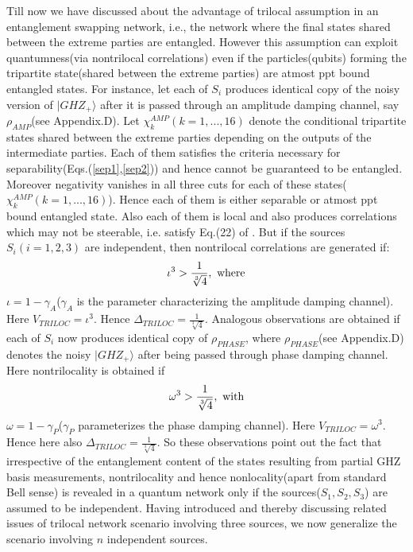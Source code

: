 \documentclass[pra,10pt,twocolumn,superscriptaddress,floatfix,showpacs]{revtex4-1}
\begin{document}
 Till now we have discussed about the advantage of trilocal assumption in an entanglement swapping network, i.e., the network where the final states shared between the extreme parties are entangled. However this assumption can exploit quantumness(via nontrilocal correlations) even if the particles(qubits) forming the tripartite state(shared between the extreme parties) are atmost ppt bound entangled states\cite{review}. For instance, let each of $S_i$ produces identical copy of the noisy version of $|GHZ_+\rangle$ after it is passed through an amplitude damping channel\cite{NIE,MARK1}, say $\rho_{AMP}$(see Appendix.D). Let $\chi_k^{AMP}(k=1,...,16)$ denote the conditional tripartite states shared between the extreme parties depending on the outputs of the intermediate parties. Each of them satisfies the criteria necessary for separability(Eqs.(\ref{sep1},\ref{sep2})) and hence cannot be guaranteed to be entangled. Moreover negativity vanishes in all three cuts for each of these states($\chi_k^{AMP}(k=1,...,16)$). Hence each of them is either separable or atmost ppt bound entangled state. Also each of them is local\cite{Sliwa} and also produces correlations which may not be steerable, i.e. satisfy Eq.(22) of \cite{caval1}. But if the sources $S_i(i=1,2,3)$ are independent, then nontrilocal correlations are generated if:
 \begin{equation}\label{amp}
    \iota^3>\frac{1}{\sqrt[3]{4}},\,\,\textmd{where}
 \end{equation}
 $\iota=1-\gamma_A$($\gamma_A$ is the parameter characterizing the amplitude damping channel). Here $V_{TRILOC}=\iota^3$. Hence $\Delta_{TRILOC}=\frac{1}{\sqrt[3]{4}}$. Analogous observations are obtained if each of $S_i$ now produces identical copy of $\rho_{PHASE}$, where $\rho_{PHASE}$(see Appendix.D) denotes the noisy $|GHZ_+\rangle$ after being passed through phase damping channel\cite{NIE,MARK1}. Here nontrilocality is obtained if
  \begin{equation}\label{phase}
    \omega^3>\frac{1}{\sqrt[3]{4}},\,\, \textmd{with}
  \end{equation}
  $\omega=1-\gamma_P$($\gamma_P$ parameterizes the phase damping channel). Here $V_{TRILOC}=\omega^3$.
  Hence here also $\Delta_{TRILOC}=\frac{1}{\sqrt[3]{4}}$. So these observations point out the fact that irrespective of the entanglement content of the states resulting from partial GHZ basis measurements, nontrilocality and hence nonlocality(apart from standard Bell sense) is revealed in a quantum network only if the sources($S_1,S_2,S_3$) are assumed to be independent. Having introduced and thereby discussing related issues of trilocal network scenario involving three sources, we now generalize the scenario involving $n$ independent sources.
\end{document}
